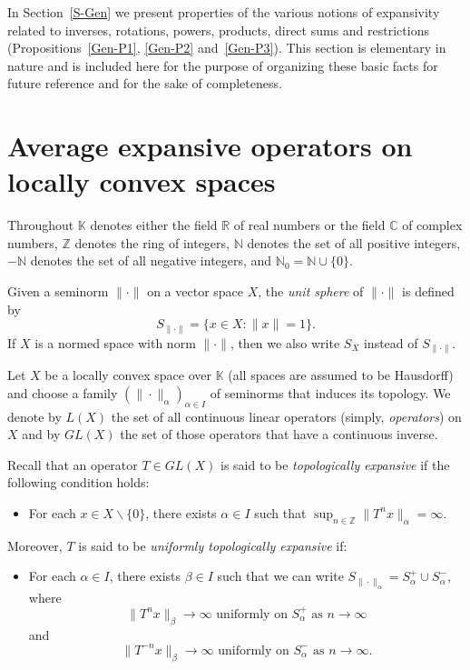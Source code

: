 \documentclass[12pt]{amsart}
\theoremstyle{theorem}
\theoremstyle{definition}
\theoremstyle{remark} \theoremstyle{question} \theoremstyle{example}
\newcommand{\N}{\mathbb{N}}   %
\newcommand{\Z}{\mathbb{Z}}   %
\newcommand{\R}{\mathbb{R}}   %
\newcommand{\C}{\mathbb{C}}   %
\newcommand{\K}{\mathbb{K}}   %
\begin{document}
In Section~\ref{S-Gen} we present properties of the various notions of expansivity related to inverses, rotations, powers, products,
direct sums and restrictions (Propositions~\ref{Gen-P1}, \ref{Gen-P2} and~\ref{Gen-P3}).
This section is elementary in nature and is included here for the purpose of organizing these basic facts for future reference 
and for the sake of completeness.



\section{Average expansive operators on locally convex spaces}\label{S-AE}

Throughout $\K$ denotes either the field $\R$ of real numbers or the field $\C$ of complex numbers, $\Z$ denotes the ring of integers, 
$\N$ denotes the set of all positive integers, $-\N$ denotes the set of all negative integers, and $\N_0 = \N \cup \{0\}$.

Given a seminorm $\|\cdot\|$ on a vector space $X$, the {\em unit sphere} of $\|\cdot\|$ is defined by
\[
S_{\|\cdot\|} = \{x \in X : \|x\| = 1\}.
\]
If $X$ is a normed space with norm $\|\cdot\|$, then we also write $S_X$ instead of $S_{\|\cdot\|}$.

Let $X$ be a locally convex space over $\K$ (all spaces are assumed to be Hausdorff) and choose a family 
$(\|\cdot\|_\alpha)_{\alpha \in I}$ of seminorms that induces its topology.
We denote by $L(X)$ the set of all continuous linear operators (simply, {\em operators}) on $X$
and by $GL(X)$ the set of those operators that have a continuous inverse.

Recall that an operator $T \in GL(X)$ is said to be {\em topologically expansive} if the following condition holds:
\begin{itemize}
\item [(E)] For each $x \in X \backslash \{0\}$, there exists $\alpha \in I$ such that $\sup_{n \in \Z} \|T^n x\|_\alpha = \infty$.
\end{itemize}
Moreover, $T$ is said to be {\em uniformly topologically expansive} if:
\begin{itemize}
\item [(UE)] For each $\alpha \in I$, there exists $\beta \in I$ such that we can write 
$S_{\|\cdot\|_\alpha} = S^+_\alpha \cup S^-_\alpha$, where
\[
\|T^n x\|_\beta \to \infty \text{ uniformly on } S^+_\alpha \text{ as } n \to \infty
\]
and
\[
\|T^{-n} x\|_\beta \to \infty \text{ uniformly on } S^-_\alpha \text{ as } n \to \infty.
\]
\end{itemize}
\end{document}
